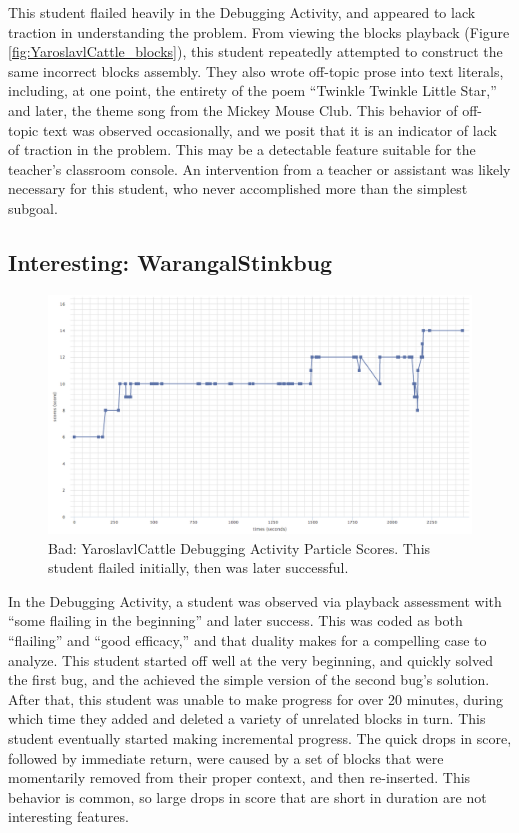 This student flailed heavily in the Debugging Activity, and appeared to lack traction in understanding the problem. From viewing the blocks playback (Figure \ref{fig:YaroslavlCattle_blocks}), this student repeatedly attempted to construct the same incorrect blocks assembly. They also wrote off-topic prose into text literals, including, at one point, the entirety of the poem ``Twinkle Twinkle Little Star,'' and later, the theme song from the Mickey Mouse Club. This behavior of off-topic text was observed occasionally, and we posit that it is an indicator of lack of traction in the problem. This may be a detectable feature suitable for the teacher's classroom console. An intervention from a teacher or assistant was likely necessary for this student, who never accomplished more than the simplest subgoal. 


\subsection{Interesting: WarangalStinkbug}
\begin{figure}
	\centering
	\includegraphics[width=\textwidth]{images/stories/scores-debug-WarangalStinkbug}
	\caption[Bad: YaroslavlCattle Debugging Activity Particle Scores]{Bad: YaroslavlCattle Debugging Activity Particle Scores. This student flailed initially, then was later successful.}
	\label{fig:WarangalStinkbug_chart}
\end{figure}
In the Debugging Activity, a student was observed via playback assessment with ``some flailing in the beginning'' and later success. This was coded as both ``flailing'' and ``good efficacy,'' and that duality makes for a compelling case to analyze. This student started off well at the very beginning, and quickly solved the first bug, and the achieved the simple version of the second bug's solution. After that, this student was unable to make progress for over 20 minutes, during which time they added and deleted a variety of unrelated blocks in turn. This student eventually started making incremental progress. The quick drops in score, followed by immediate return, were caused by a set of blocks that were momentarily removed from their proper context, and then re-inserted. This behavior is common, so large drops in score that are short in duration are not interesting features.


